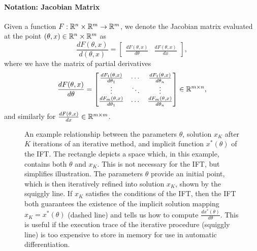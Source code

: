 \documentclass[11pt]{article}
\begin{document}
\paragraph{Notation: Jacobian Matrix}
Given a function $F:\mathbb{R}^n\times\mathbb{R}^m\to\mathbb{R}^m$, we denote the Jacobian matrix evaluated at
the point $(\theta,x)\in\mathbb{R}^n\times\mathbb{R}^m$ as
\begin{equation*}
\frac{dF(\theta,x)}{d(\theta,x)} = \begin{bmatrix}
    \frac{dF(\theta,x)}{d\theta} &\frac{dF(\theta,x)}{dx} 
\end{bmatrix},
\end{equation*}
where we have the matrix of partial derivatives
\begin{equation*}
\frac{dF(\theta,x)}{d\theta} = \begin{bmatrix}
    \frac{dF_1(\theta,x)}{d\theta_1} & \cdots & \frac{dF_1(\theta,x)}{d\theta_n} \\
    \vdots & \ddots & \vdots \\
    \frac{dF_m(\theta,x)}{d\theta_1} & \cdots & \frac{dF_m(\theta,x)}{d\theta_n} \\
\end{bmatrix}\in\mathbb{R}^{m\times n},
\end{equation*}
and similarly for $\frac{dF(\theta,x)}{dx}\in\mathbb{R}^{m\times m}$.


\begin{figure}
\centering
{}
\caption{
\label{fig:optift}
An example relationship between the parameters $\theta$,
solution $x_{K}$ after $K$ iterations of an iterative method,
and implicit function $x^*(\theta)$ of the IFT.
The rectangle depicts a space which, in this example,
contains both $\theta$ and $x_K$.
This is not necessary for the IFT, but simplifies illustration.
The parameters $\theta$ provide an initial point, which is then iteratively refined
into solution $x_{K}$, shown by the squiggly line.
If $x_{K}$ satisfies the conditions of the IFT, then the IFT both
guarantees the existence of the implicit solution mapping $x_K = x^*(\theta)$
(dashed line)
and tells us how to compute $\frac{dx^*(\theta)}{d\theta}$.
This is useful if the execution trace of the iterative procedure (squiggly line)
is too expensive to store in memory for use in automatic differentiation.
}
\end{figure}
\end{document}
